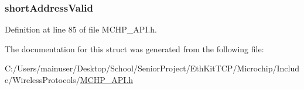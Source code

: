 \subsubsection[{short\+Address\+Valid}]{ short\+Address\+Valid}\label{struct_____c_o_n_n_e_c_t_i_o_n___s_t_a_t_u_s_1_1___c_o_n_n_e_c_t_i_o_n___s_t_a_u_t_s__bits_a610d1dbda5ffdeaf128f9bc86beb761a}


Definition at line 85 of file M\+C\+H\+P\+\_\+\+A\+P\+I.\+h.



The documentation for this struct was generated from the following file\+:\begin{DoxyCompactItemize}
\item 
C\+:/\+Users/mainuser/\+Desktop/\+School/\+Senior\+Project/\+Eth\+Kit\+T\+C\+P/\+Microchip/\+Include/\+Wireless\+Protocols/\hyperlink{_m_c_h_p___a_p_i_8h}{M\+C\+H\+P\+\_\+\+A\+P\+I.\+h}\end{DoxyCompactItemize}
